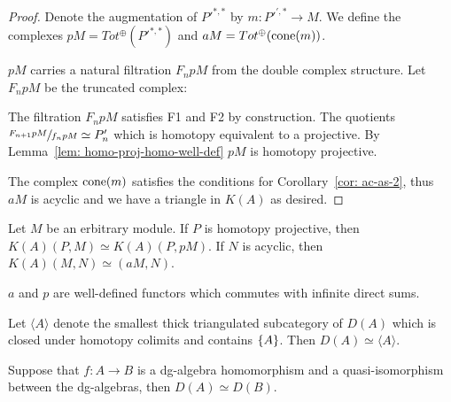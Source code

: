 \documentclass[../thesis.tex]{subfiles}
\begin{document}
\begin{proof}
                Denote the augmentation of $P'^{*,*}$ by $m : P'^{',*} \rightarrow M$. We define the complexes $pM = Tot^\oplus(P'^{*,*})$ and $aM = Tot^\oplus(\tt{cone}(m))$.
                
                $pM$ carries a natural filtration $F_npM$ from the double complex structure. Let $F_npM$ be the truncated complex:
                \begin{center}
                \end{center}
                
                The filtration $F_npM$ satisfies F1 and F2 by construction. The quotients $\sfrac{F_{n+1}pM}{f_npM} \simeq P'_n$ which is homotopy equivalent to a projective. By Lemma~\ref{lem: homo-proj-homo-well-def} $pM$ is homotopy projective.
                
                The complex $\tt{cone}(m)$ satisfies the conditions for Corollary~\ref{cor: ac-as-2}, thus $aM$ is acyclic and we have a triangle in $K(A)$ as desired.
            \end{proof}

            \begin{corollary}
                Let $M$ be an erbitrary module. If $P$ is homotopy projective, then $K(A)(P,M) \simeq K(A)(P, pM)$. If $N$ is acyclic, then $K(A)(M, N) \simeq (aM, N)$.

                $a$ and $p$ are well-defined functors which commutes with infinite direct sums. 
            \end{corollary}

            \begin{corollary}
                Let $\langle A \rangle$ denote the smallest thick triangulated subcategory of $D(A)$ which is closed under homotopy colimits and contains $\startset{A}$. Then $D(A) \simeq \langle A \rangle$.
            \end{corollary}

            \begin{corollary}\label{cor: ring-qiso-is-eq}
                Suppose that $f : A \rightarrow B$ is a dg-algebra homomorphism and a quasi-isomorphism between the dg-algebras, then $D(A) \simeq D(B)$.
            \end{corollary}
\end{document}
